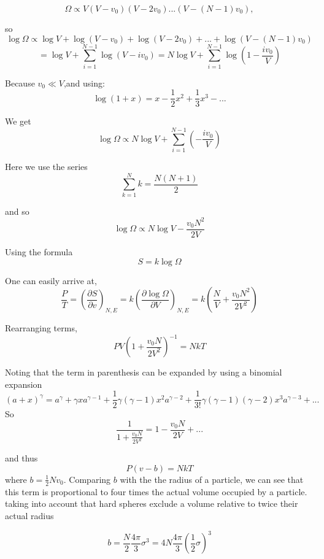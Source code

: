 \documentclass[10pt,twoside,openright]{memoir}
\begin{document}
$$
\Omega \propto V (V - v_0)(V-2v_0)...(V - (N-1)v_0),
$$

so
$$
\log \Omega \propto \log V + \log \left( V - v_0 \right) + \log \left( V-2v_0 \right) + ... + \log \left(V - \left( N-1\right)v_0\right)
$$
$$
= \log V + \sum_{i=1}^{N-1} \log \left( V - iv_0 \right) 
= N \log V + \sum_{i=1}^{N-1} \log \left( 1 - \frac{iv_0}{V} \right)
$$

Because $v_0 \ll V$,and using:
\begin{equation}
\log \left( 1 + x \right) = x -\frac{1}{2}x^2 + \frac{1}{3}x^3 -...
\end{equation}

We get
$$
\log \Omega \propto N \log V + \sum_{i=1}^{N-1} \left( - \frac{iv_0}{V} \right)
$$

Here we use the series
\begin{equation}
\sum_{k=1}^{N} k = \frac{N(N+1)}{2}
\end{equation}

and so
$$
\log \Omega \propto N \log V - \frac{v_0 N^2}{2V}
$$

Using the formula
\begin{equation}
S = k \log \Omega 
\end{equation}

One can easily arrive at,
$$
\frac{P}{T} = \left( \frac{\partial S}{\partial v} \right)_{N,E} 
= k \left( \frac{\partial \log \Omega}{\partial V} \right)_{N,E} 
= k \left( \frac{N}{V} + \frac{v_0 N^2}{2V^2} \right)
$$

Rearranging terms,
$$
PV \left( 1+ \frac{v_0 N}{2V^2}\right)^{-1} = NkT
$$

Noting that the term in parenthesis can be expanded by using a binomial expansion
\begin{equation}
\left( a + x \right)^\gamma = a^\gamma + \gamma x a^{\gamma -1} + \frac{1}{2}\gamma (\gamma - 1)x^2 a^{\gamma -2} + \frac{1}{3!}\gamma (\gamma - 1)(\gamma - 2)x^3 a^{\gamma -3} + ...
\end{equation}
So 
$$
\frac{1}{1+ \frac{v_0 N}{2V^2}} = 1 - \frac{v_0 N}{2V} + ...
$$

and thus
$$
P(v-b)=NkT
$$
where $b = \frac{1}{2}N v_0$. Comparing $b$ with the the radius of a particle, we can see that this term is proportional to four times the actual volume occupied by a particle. taking into account that hard spheres exclude a volume relative to twice their actual radius

$$
b = \frac{N}{2}\frac{4 \pi}{3} \sigma^3 = 4N \frac{4 \pi}{3} \left( \frac{1}{2}\sigma \right)^3
$$
\end{document}
